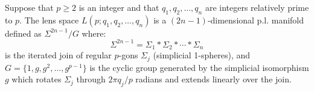 Suppose that $p \geq 2$ is an integer and that $q_1, q_2, \ldots, q_n$ are integers relatively prime to $p$. The lens space $L(p; q_1, q_2, \ldots, q_n)$ is a $(2n-1)$-dimensional p.l. manifold defined as $\Sigma^{2n-1}/G$ where:
$$\Sigma^{2n-1} = \Sigma_1 * \Sigma_2 * \cdots * \Sigma_n$$
is the iterated join of regular $p$-gons $\Sigma_j$ (simplicial 1-spheres), and $G = \{1, g, g^2, \ldots, g^{p-1}\}$ is the cyclic group generated by the simplicial isomorphism $g$ which rotates $\Sigma_j$ through $2\pi q_j/p$ radians and extends linearly over the join.
